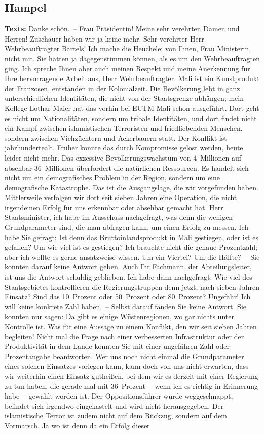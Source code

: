 \documentclass{article}
\begin{document}
\subsection{Hampel}
\noindent\textbf{Texts:} Danke schön. – Frau Präsidentin! Meine sehr verehrten Damen und Herren! Zuschauer haben wir ja keine mehr. Sehr verehrter Herr Wehrbeauftragter Bartels! Ich mache die Heuchelei von Ihnen, Frau Ministerin, nicht mit. Sie hätten ja dagegenstimmen können, als es um den Wehrbeauftragten ging. Ich spreche Ihnen aber auch meinen Respekt und meine Anerkennung für Ihre hervorragende Arbeit aus, Herr Wehrbeauftragter.  Mali ist ein Kunstprodukt der Franzosen, entstanden in der Kolonialzeit. Die Bevölkerung lebt in ganz unterschiedlichen Identitäten, die nicht von der Staatsgrenze abhängen; mein Kollege Lothar Maier hat das vorhin bei EUTM Mali schon ausgeführt.  Dort geht es nicht um Nationalitäten, sondern um tribale Identitäten, und dort findet nicht ein Kampf zwischen islamistischen Terroristen und friedliebenden Menschen, sondern zwischen Viehzüchtern und Ackerbauern statt. Der Konflikt ist jahrhundertealt. Früher konnte das durch Kompromisse gelöst werden, heute leider nicht mehr. Das exzessive Bevölkerungswachstum von 4 Millionen auf absehbar 36 Millionen überfordert die natürlichen Ressourcen. Es handelt sich nicht um ein demografisches Problem in der Region, sondern um eine demografische Katastrophe. Das ist die Ausgangslage, die wir vorgefunden haben. Mittlerweile verfolgen wir dort seit sieben Jahren eine Operation, die nicht irgendeinen Erfolg für uns erkennbar oder absehbar gemacht hat. Herr Staatsminister, ich habe im Ausschuss nachgefragt, was denn die wenigen Grundparameter sind, die man abfragen kann, um einen Erfolg zu messen. Ich habe Sie gefragt: Ist denn das Bruttoinlandsprodukt in Mali gestiegen, oder ist es gefallen? Um wie viel ist es gestiegen? Ich brauchte nicht die genaue Prozentzahl; aber ich wollte es gerne ansatzweise wissen. Um ein Viertel? Um die Hälfte? – Sie konnten darauf keine Antwort geben. Auch Ihr Fachmann, der Abteilungsleiter, ist uns die Antwort schuldig geblieben. Ich habe dann nachgefragt: Wie viel des Staatsgebietes kontrollieren die Regierungstruppen denn jetzt, nach sieben Jahren Einsatz? Sind das 10 Prozent oder 50 Prozent oder 80 Prozent? Ungefähr! Ich will keine konkrete Zahl haben. – Selbst darauf fanden Sie keine Antwort. Sie konnten nur sagen: Da gibt es einige Wüstenregionen, wo gar nichts unter Kontrolle ist.  Was für eine Aussage zu einem Konflikt, den wir seit sieben Jahren begleiten! Nicht mal die Frage nach einer verbesserten Infrastruktur oder der Produktivität in dem Lande konnten Sie mit einer ungefähren Zahl oder Prozentangabe beantworten. Wer uns noch nicht einmal die Grundparameter eines solchen Einsatzes vorlegen kann, kann doch von uns nicht erwarten, dass wir weiterhin einen Einsatz gutheißen, bei dem wir es derzeit mit einer Regierung zu tun haben, die gerade mal mit 36 Prozent – wenn ich es richtig in Erinnerung habe – gewählt worden ist. Der Oppositionsführer wurde weggeschnappt, befindet sich irgendwo eingekastelt und wird nicht herausgegeben. Der islamistische Terror ist zudem nicht auf dem Rückzug, sondern auf dem Vormarsch. Ja wo ist denn da ein Erfolg dieser 
\end{document}
